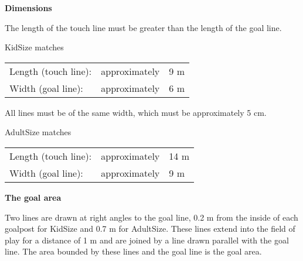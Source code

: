 \bigskip

{\textbf{Dimensions}}

\headlinebox

The length of the touch line must be greater than the length of the goal line. 

\bigskip

KidSize matches

\begin{tabular}{lll}
Length (touch line): &approximately &9 m \\
Width (goal line): &approximately &6 m
\end{tabular}


\bigskip

All lines must be of the same width, which must be approximately 5 cm. 



\bigskip

AdultSize matches

\begin{tabular}{lll}
Length (touch line): &approximately & 14 m \\ 
Width (goal line): &approximately &9 m\\
\end{tabular}


\bigskip

{\bfseries The goal area }

\headlinebox

Two lines are drawn at right angles to the goal line, 0.2 m from the inside of each goalpost for KidSize and 0.7 m for AdultSize.
These lines extend into the field of play for a distance of 1 m and are joined
by a line drawn parallel with the goal line.
The area bounded by these lines and the goal line is the goal area.

